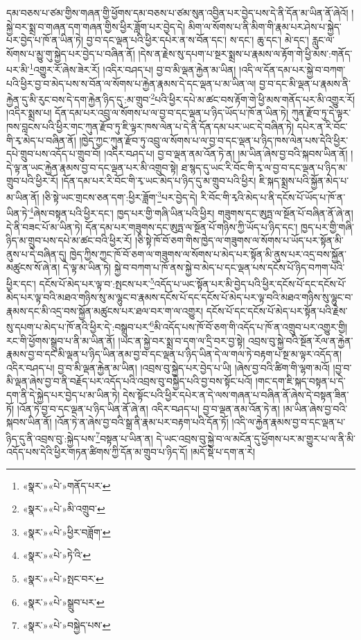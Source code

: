 དམ་བཅས་པ་ཙམ་གྱིས་གཞན་གྱི་ཕྱོགས་དམ་བཅས་པ་ཙམ་སུན་འབྱིན་པར་བྱེད་པས་དེ་ནི་དོན་མ་ཡིན་ནོ་ཞེའོ། །
སྐྱེ་བར་སྨྲ་བ་གཞན་དག་གཞན་གྱིས་ཕྱིར་ཟློག་པར་བྱེད་དེ། མིག་ལ་སོགས་པ་ནི་མིག་གི་རྣམ་པར་ཤེས་པ་སྐྱེད་པར་བྱེད་པ་ཁོ་ན་ཡིན་ཏེ། བྱ་བ་དང་ལྡན་པའི་ཕྱིར་དཔེར་ན་ས་བོན་དང་། ས་དང་། ཆུ་དང་། མེ་དང་། རླུང་ལ་སོགས་པ་མྱུ་གུ་སྐྱེད་པར་བྱེད་པ་བཞིན་ནོ། །དེས་ན་རྗེས་སུ་དཔག་པ་སྔར་སྨྲས་པ་རྣམས་ལ་རྟོག་གེ་ཕྱི་མས་:གནོད་པར་མི་\footnote{«སྣར་»«པེ་»གནོད་པར་}འགྱུར་རོ་ཞེས་ཟེར་རོ། །འདིར་བཤད་པ། བྱ་བ་མི་ལྡན་རྐྱེན་མ་ཡིན། །འདི་ལ་དོན་དམ་པར་སྐྱེ་བ་བཀག་པའི་ཕྱིར་བྱ་བ་མེད་པས་ས་བོན་ལ་སོགས་པ་རྐྱེན་རྣམས་དེ་དང་ལྡན་པ་མ་ཡིན་ལ། བྱ་བ་དང་མི་ལྡན་པ་རྣམས་ནི་རྐྱེན་དུ་མི་རུང་བས་དེ་དག་རྐྱེན་ཉིད་དུ་:མ་གྲུབ་\footnote{«སྣར་»«པེ་»མི་འགྲུབ་}པའི་ཕྱིར་དཔེ་མ་ཚང་བས་རྟོག་གེ་ཕྱི་མས་གནོད་པར་མི་འགྱུར་རོ། །འདིར་སྨྲས་པ། དོན་དམ་པར་འབྲུ་ལ་སོགས་པ་ལ་བྱ་བ་དང་ལྡན་པ་ཉིད་ཡོད་པ་ཁོ་ན་ཡིན་ཏེ། ཀུན་རྫོབ་ཏུ་དེ་ལྟར་ཁས་བླངས་པའི་ཕྱིར་གང་ཀུན་རྫོབ་ཏུ་ཇི་ལྟར་ཁས་ལེན་པ་དེ་ནི་དོན་དམ་པར་ཡང་དེ་བཞིན་ཏེ། དཔེར་ན་རི་བོང་གི་རྭ་མེད་པ་བཞིན་ནོ། །ཁྱེད་ཀྱང་ཀུན་རྫོབ་ཏུ་འབྲུ་ལ་སོགས་པ་ལ་བྱ་བ་དང་ལྡན་པ་ཉིད་ཁས་ལེན་པས་དེའི་ཕྱིར་དཔེ་གྲུབ་པས་འདོད་པ་གྲུབ་བོ། །འདིར་བཤད་པ། བྱ་བ་ལྡན་ནམ་འོན་ཏེ་ན། །མ་ཡིན་ཞེས་བྱ་བའི་སྐབས་ཡིན་ནོ། །དེ་ལྟ་ན་ཡང་རྐྱེན་རྣམས་བྱ་བ་དང་ལྡན་པར་མི་འགྲུབ་སྟེ། ཐ་སྙད་དུ་ཡང་རི་བོང་གི་རྭ་ལ་བྱ་བ་དང་ལྡན་པ་ཉིད་མ་གྲུབ་པའི་ཕྱིར་རོ། །དོན་དམ་པར་རི་བོང་གི་རྭ་ཡང་མེད་པ་ཉིད་དུ་མ་གྲུབ་པའི་ཕྱིར། ཇི་སྐད་སྨྲས་པའི་སྐྱོན་མེད་པ་མ་ཡིན་ནོ། །ཅི་སྟེ་ཡང་གྲངས་ཅན་དག་:ཕྱིར་ཟློག་\footnote{«སྣར་»«པེ་»ཕྱིར་བཟློག་}པར་བྱེད་དེ། རི་བོང་གི་རྭའི་མེད་པ་ནི་དངོས་པོ་ཡོད་པ་ཁོ་ན་ཡིན་ཏེ་\footnote{«སྣར་»«པེ་»ཏེ་འི་}ཞེས་བསྟན་པའི་ཕྱིར་དང་། ཁྱད་པར་གྱི་གཞི་ཡིན་པའི་ཕྱིར། གཟུགས་དང་ཨུཏྤ་ལ་སྔོན་པོ་བཞིན་ནོ་ཞེ་ན། དེ་ནི་བཟང་པོ་མ་ཡིན་ཏེ། དོན་དམ་པར་གཟུགས་དང་ཨུཏྤ་ལ་སྔོན་པོ་གཉིས་ཀྱི་ཡོད་པ་ཉིད་དང་། ཁྱད་པར་གྱི་གཞི་ཉིད་མ་གྲུབ་པས་དཔེ་མ་ཚང་བའི་ཕྱིར་རོ། །ཅི་སྟེ་ཁོ་བོ་ཅག་གིས་ཁྱེད་ལ་གཟུགས་ལ་སོགས་པ་ཡོད་པར་སྟོན་མི་ནུས་པ་དེ་བཞིན་དུ། ཁྱེད་ཀྱིས་ཀྱང་ཁོ་བོ་ཅག་ལ་གཟུགས་ལ་སོགས་པ་མེད་པར་སྟོན་མི་ནུས་པར་འདྲ་བས་སྐྱོན་མཚུངས་སོ་ཞེ་ན། དེ་ལྟ་མ་ཡིན་ཏེ། སྐྱེ་བ་བཀག་པ་ཁོ་ནས་སྐྱེ་བ་མེད་པ་དང་ལྡན་པས་དངོས་པོ་ཉིད་བཀག་པའི་ཕྱིར་དང་། དངོས་པོ་མེད་པར་ལྟ་བ་:སྤངས་པར་\footnote{«སྣར་»«པེ་»སྤང་བར་}འདོད་པ་ཡང་སྟོན་པར་མི་བྱེད་པའི་ཕྱིར་དངོས་པོ་དང་དངོས་པོ་མེད་པར་ལྟ་བའི་མཐའ་གཉིས་སུ་མ་ལྷུང་བ་རྣམས་དངོས་པོ་དང་དངོས་པོ་མེད་པར་ལྟ་བའི་མཐའ་གཉིས་སུ་ལྷུང་བ་རྣམས་དང་མི་འདྲ་བས་སྐྱོན་མཚུངས་པར་ཐལ་བར་ག་ལ་འགྱུར། དངོས་པོ་དང་དངོས་པོ་མེད་པར་སྟོན་པའི་རྗེས་སུ་དཔག་པ་མེད་པ་ཁོ་ནའི་ཕྱིར་དེ་:བསྒྲུབ་པར་\footnote{«སྣར་»«པེ་»སྒྲུབ་པར་}མི་འདོད་པས་ཁོ་བོ་ཅག་གི་འདོད་པ་ཁོ་ན་འགྲུབ་པར་འགྱུར་གྱི། རང་གི་ཕྱོགས་སྒྲུབ་པ་ནི་མ་ཡིན་ནོ། །ཡང་ན་སྐྱེ་བར་སྨྲ་བ་དག་ལ་དྲི་བར་བྱ་སྟེ། འབྲས་བུ་སྐྱེ་བའི་སྔོན་རོལ་ན་རྐྱེན་རྣམས་བྱ་བ་དང་མི་ལྡན་པ་ཉིད་ཡིན་ནམ་བྱ་བ་དང་ལྡན་པ་ཉིད་ཡིན་དེ་ལ་གལ་ཏེ་བརྟག་པ་སྔ་མ་ལྟར་འདོད་ན། འདིར་བཤད་པ། བྱ་བ་མི་ལྡན་རྐྱེན་མ་ཡིན། །འབྲས་བུ་སྐྱེད་པར་བྱེད་པ་ཡི། །ཞེས་བྱ་བའི་ཚིག་གི་ལྷག་མའོ། །བྱ་བ་མི་ལྡན་ཞེས་བྱ་བ་ནི་བརྗོད་པར་འདོད་པའི་འབྲས་བུ་བསྐྱེད་པའི་བྱ་བས་སྟོང་པའོ། །གང་དག་ཇི་སྐད་བསྟན་པ་དེ་དག་ནི་དེ་སྐྱེད་པར་བྱེད་པ་མ་ཡིན་ཏེ། དེས་སྟོང་པའི་ཕྱིར་དཔེར་ན་དེ་ལས་གཞན་པ་བཞིན་ནོ་ཞེས་དེ་བསྟན་ཟིན་ཏོ། །འོན་ཏེ་བྱ་བ་དང་ལྡན་པ་ཉིད་ཡིན་ནོ་ཞེ་ན། འདིར་བཤད་པ། བྱ་བ་ལྡན་ནམ་འོན་ཏེ་ན། །མ་ཡིན་ཞེས་བྱ་བའི་སྐབས་ཡིན་ནོ། །འོན་ཏེ་ན་ཞེས་བྱ་བའི་སྒྲ་ནི་རྣམ་པར་བརྟག་པའི་དོན་ཏོ། །འདི་ལ་རྐྱེན་རྣམས་བྱ་བ་དང་ལྡན་པ་ཉིད་དུ་ནི་འབྲས་བུ་:སྐྱེད་པས་\footnote{«སྣར་»«པེ་»བསྐྱེད་པས་}བསྟན་པ་ཡིན་ན། དེ་ཡང་འབྲས་བུ་སྐྱེ་བ་ལ་མངོན་དུ་ཕྱོགས་པར་མ་གྱུར་པ་ལ་ནི་མི་འདོད་པས་དེའི་ཕྱིར་གཏན་ཚིགས་ཀྱི་དོན་མ་གྲུབ་པ་ཉིད་དོ། །མདོ་སྡེ་པ་དག་ན་རེ། 